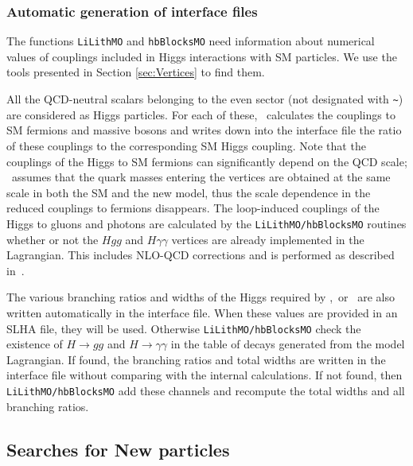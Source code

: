 \documentclass[12pt,a4paper]{article}
\begin{document}
\subsubsection{Automatic generation of interface files}
\label{sec:auto}

The functions {\tt LiLithMO} and {\tt hbBlocksMO}    need information about numerical values of   couplings included in Higgs interactions with SM particles.  We use the tools presented in Section \ref{sec:Vertices}  to  find them. 
 
All the QCD-neutral scalars belonging to the even sector (not designated with \verb|~|)  are considered as  Higgs particles. For each of these, \micro\ calculates  the couplings to  SM fermions and massive  bosons and  writes down into the interface file the ratio of these couplings to the  corresponding  SM Higgs coupling. Note that the  couplings of the Higgs to   SM  fermions can significantly depend on the QCD scale; \micro\ assumes that the quark masses entering the vertices are obtained at the same scale in both  the
SM and  the new model, thus the scale dependence in the  reduced couplings to fermions disappears. 
The loop-induced  couplings of the Higgs to  gluons and photons are calculated by the {\tt LiLithMO/hbBlocksMO}  routines whether or not the $Hgg$ and $H\gamma\gamma$ vertices are already implemented in the Lagrangian. This includes NLO-QCD corrections and is performed as described in~\cite{Belanger:2013oya,Djouadi:1997yw}.

The various branching ratios and widths of the Higgs required by   \HB,\HS\ or  \lilith\ are also written automatically in the interface file. When these 
values  are provided in an SLHA file, they will be used. Otherwise {\tt LiLithMO/hbBlocksMO}  check  the existence
of $H\rightarrow gg$  and $H\rightarrow \gamma\gamma$  in the table of decays generated from the model Lagrangian. If found, the branching ratios and total widths are written in the  interface file without comparing  with the internal calculations. If not found, then {\tt LiLithMO/hbBlocksMO} add these channels and  recompute the total widths and all branching ratios.


\subsection{Searches for New particles}
\end{document}
